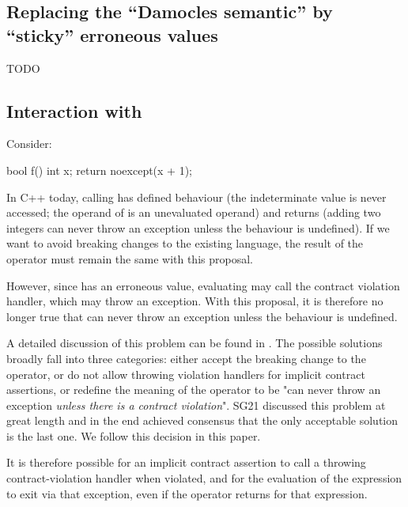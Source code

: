 \subsection{Replacing the ``Damocles semantic'' by ``sticky'' erroneous values}
\label{damocles}

TODO


\subsection{Interaction with }

Consider:
\begin{codeblock}
bool f() {
  int x;
  return noexcept(x + 1);
}
\end{codeblock}
In C++ today, calling  has defined behaviour (the indeterminate value is never accessed; the operand of  is an unevaluated operand) and returns  (adding two integers can never throw an exception unless the behaviour is undefined). If we want to avoid breaking changes to the existing language, the result of the  operator must remain the same with this proposal.

However, since  has an erroneous value, evaluating  may call the contract violation handler, which may throw an exception. With this proposal, it is therefore no longer true that  can never throw an exception unless the behaviour is undefined.

A detailed discussion of this problem can be found in \cite{P3541R1}. The possible solutions broadly fall into three categories: either accept the breaking change to the  operator, or do not allow throwing violation handlers for implicit contract assertions, or redefine the  meaning of the  operator to be "can never throw an exception \emph{unless there is a contract violation}". SG21 discussed this problem at great length and in the end achieved consensus that the only acceptable solution is the last one. We follow this decision in this paper.

It is therefore possible for an implicit contract assertion to call a throwing contract-violation handler when violated, and for the evaluation of the expression to exit via that exception, even if the  operator returns  for that expression.

